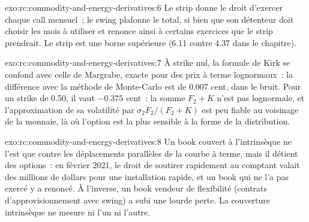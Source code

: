 \begin{solution}{exo:rc:commodity-and-energy-derivatives:6}
Le strip donne le droit d'exercer chaque call mensuel~; le swing plafonne le total, si bien que son
détenteur doit choisir les mois à utiliser et renonce ainsi à certains exercices que le strip prendrait.
Le strip est une borne supérieure (6.11 contre 4.37 dans le chapitre).
\end{solution}

\begin{solution}{exo:rc:commodity-and-energy-derivatives:7}
À strike nul, la formule de Kirk se confond avec celle de Margrabe, exacte pour des prix à terme lognormaux~: la différence
avec la méthode de Monte-Carlo est de 0.007 cent, dans le bruit. Pour un strike de 0.50, il vaut $-0.375$ cent~: la somme
$F_2+K$ n'est pas lognormale, et l'approximation de sa volatilité par $\sigma_2F_2/(F_2+K)$ est
peu fiable au voisinage de la monnaie, là où l'option est la plus sensible à la forme de la distribution.
\end{solution}

\begin{solution}{exo:rc:commodity-and-energy-derivatives:8}
Un book couvert à l'intrinsèque ne l'est que contre les déplacements parallèles de la courbe à terme, mais il
détient des options~: en février 2021, le droit de soutirer rapidement au comptant valait des millions de
dollars pour une installation rapide, et un book qui ne l'a pas exercé y a renoncé. À l'inverse, un
book vendeur de flexibilité (contrats d'approvisionnement avec swing) a subi une lourde perte. La couverture
intrinsèque ne mesure ni l'un ni l'autre.
\end{solution}

